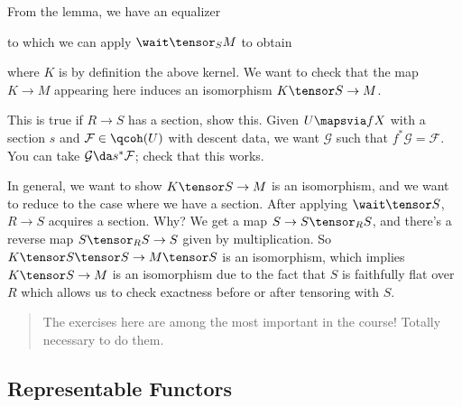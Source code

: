 From the lemma, we have an equalizer

\begin{center}
\end{center}

to which we can apply \(\wait \tensor_S M\) to obtain

\begin{center}
\end{center}

where \(K\) is by definition the above kernel. We want to check that the
map \(K\to M\) appearing here induces an isomorphism
\(K\tensor S \to M\).

\begin{exercise}[Important]

This is true if \(R\to S\) has a section, show this. Given
\(U\mapsvia f X\) with a section \(s\) and \(\mathcal{F}\in \qcoh(U)\)
with descent data, we want \(\mathcal{G}\) such that
\(f^* \mathcal{G} = \mathcal{F}\). You can take
\(\mathcal{G}\da s^* \mathcal{F}\); check that this works.

\end{exercise}

In general, we want to show \(K\tensor S \to M\) is an isomorphism, and
we want to reduce to the case where we have a section. After applying
\(\wait \tensor S\), \(R\to S\) acquires a section. Why? We get a map
\(S\to S\tensor_R S\), and there's a reverse map \(S\tensor_R S\to S\)
given by multiplication. So \(K\tensor S \tensor S \to M\tensor S\) is
an isomorphism, which implies \(K\tensor S\to M\) is an isomorphism due
to the fact that \(S\) is faithfully flat over \(R\) which allows us to
check exactness before or after tensoring with \(S\).

\begin{quote}
The exercises here are among the most important in the course! Totally
necessary to do them.
\end{quote}

\hypertarget{representable-functors}{%
\subsection{Representable Functors}\label{representable-functors}}

